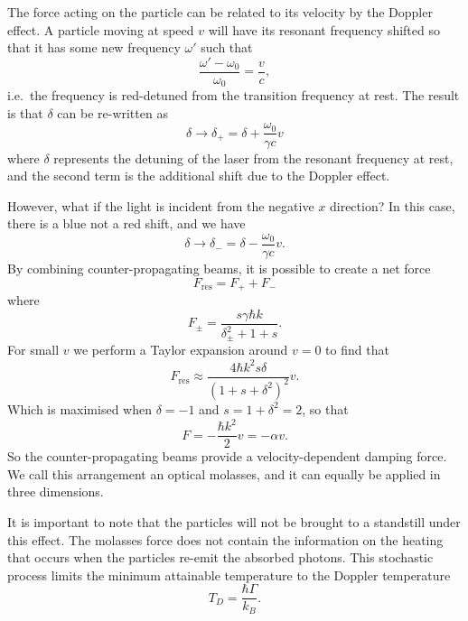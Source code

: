 The force acting on the particle can be related to its velocity by the Doppler
effect. A particle moving at speed $v$ will have its resonant frequency shifted
so that it has some new frequency $\omega'$ such that
%
\begin{equation}
  \frac{\omega'-\omega_0}{\omega_0} = \frac{v}{c},
\end{equation}
%
i.e.\ the frequency is red-detuned from the transition frequency at rest. The
result is that $\delta$ can be re-written as
%
\begin{equation}
  \delta \rightarrow \delta_+ = \delta + \frac{\omega_0}{\gamma c}v
\end{equation}
%
where $\delta$ represents the detuning of the laser from the resonant frequency
at rest, and the second term is the additional shift due to the Doppler effect.

However, what if the light is incident from the negative $x$ direction? In this
case, there is a blue not a red shift, and we have
%
\begin{equation}
  \delta \rightarrow \delta_- = \delta - \frac{\omega_0}{\gamma c}v.
\end{equation}
%
By combining counter-propagating beams, it is possible to create a net force
%
\begin{equation}
  F_\text{res} = F_+ + F_-
\end{equation}
%
where
%
\begin{equation}
  F_\pm = \frac{s\gamma\hbar k}{\delta_\pm^2 + 1 + s}.
\end{equation}
%
For small $v$ we perform a Taylor expansion around $v=0$ to find that
%
\begin{equation}
  F_\text{res} \approx \frac{4\hbar k^2 s \delta}{(1 + s
  +\delta^2)^2}v.
\end{equation}
%
Which is maximised when $\delta = -1$ and $s = 1 + \delta^2 = 2$, so that
%
\begin{equation}
  F = -\frac{\hbar k^2}{2} v = - \alpha v.
\end{equation}
%
So the counter-propagating beams provide a velocity-dependent damping
force. We call this arrangement an optical molasses, and it can equally be
applied in three dimensions.

It is important to note that the particles will not be brought to a standstill
under this effect. The molasses force does not contain the information
on the heating that occurs when the particles re-emit the absorbed photons.
This stochastic process limits the minimum attainable temperature to the
Doppler temperature~\cite{}
%
\begin{equation}
  T_D = \frac{\hbar\Gamma}{k_B}.
\end{equation}

